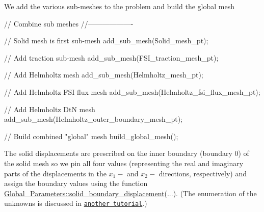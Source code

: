 We add the various sub-\/meshes to the problem and build the global mesh


\begin{DoxyCodeInclude}


 \textcolor{comment}{// Combine sub meshes}
 \textcolor{comment}{//-------------------}

 \textcolor{comment}{// Solid mesh is first sub-mesh}
 add\_sub\_mesh(Solid\_mesh\_pt);

 \textcolor{comment}{// Add traction sub-mesh}
 add\_sub\_mesh(FSI\_traction\_mesh\_pt);

 \textcolor{comment}{// Add Helmholtz mesh}
 add\_sub\_mesh(Helmholtz\_mesh\_pt);

 \textcolor{comment}{// Add Helmholtz FSI flux mesh}
 add\_sub\_mesh(Helmholtz\_fsi\_flux\_mesh\_pt);

 \textcolor{comment}{// Add Helmholtz DtN mesh}
 add\_sub\_mesh(Helmholtz\_outer\_boundary\_mesh\_pt); 

 \textcolor{comment}{// Build combined "global" mesh}
 build\_global\_mesh();

\end{DoxyCodeInclude}


The solid displacements are prescribed on the inner boundary (boundary 0) of the solid mesh so we pin all four values (representing the real and imaginary parts of the displacements in the $ x_1- $ and $ x_2-$ directions, respectively) and assign the boundary values using the function {\ttfamily \hyperlink{namespaceGlobal__Parameters_ab51fa55d06d9963d363bcf966cfcc62b}{Global\+\_\+\+Parameters\+::solid\+\_\+boundary\+\_\+displacement}}(...). (The enumeration of the unknowns is discussed in \href{../../../time_harmonic_linear_elasticity/elastic_annulus/html/index.html#element_types}{\tt another tutorial}.)


